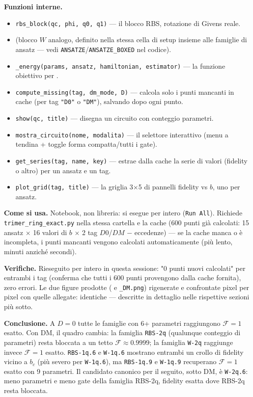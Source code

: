 \documentclass[11pt,a4paper]{article}
\begin{document}
\textbf{Funzioni interne.}
\begin{itemize}
\item \texttt{rbs\_block(qc,\ phi,\ q0,\ q1)} — il blocco RBS, rotazione di Givens
reale.
\item (blocco $W$ analogo, definito nella stessa cella di setup insieme alle
famiglie di ansatz — vedi \texttt{ANSATZE}/\texttt{ANSATZE\_BOXED} nel codice).
\item \texttt{\_energy(params,\ ansatz,\ hamiltonian,\ estimator)} — la funzione
obiettivo per \texttt{}.
\item \texttt{compute\_missing(tag,\ dm\_mode,\ D)} — calcola solo i punti mancanti
in cache (per tag \texttt{"D0"} o \texttt{"DM"}), salvando dopo ogni punto.
\item \texttt{show(qc,\ title)} — disegna un circuito con conteggio parametri.
\item \texttt{mostra\_circuito(nome,\ modalita)} — il selettore interattivo (menu a
tendina + toggle forma compatta/tutti i gate).
\item \texttt{get\_series(tag,\ name,\ key)} — estrae dalla cache la serie di
valori (fidelity o altro) per un ansatz e un tag.
\item \texttt{plot\_grid(tag,\ title)} — la griglia 3$\times$5 di pannelli fidelity
vs $b$, uno per ansatz.
\end{itemize}

\textbf{Come si usa.} Notebook, non libreria: si esegue per intero
(\texttt{Run All}). Richiede \texttt{trimer\_ring\_exact.py} nella stessa cartella e
la cache \texttt{} (600 punti già
calcolati: 15 ansatz $\times$ 16 valori di $b$ $\times$ 2 tag $D0$/$DM$ $-$
eccedenze) — se la cache manca o è incompleta, i punti mancanti vengono calcolati
automaticamente (più lento, minuti anziché secondi).

\textbf{Verifiche.} Rieseguito per intero in questa sessione: "0 punti nuovi
calcolati" per entrambi i tag (conferma che tutti i 600 punti provengono dalla
cache fornita), zero errori. Le due figure prodotte
(\texttt{} e
\texttt{\_DM.png}) rigenerate e confrontate pixel per pixel con quelle allegate:
identiche — descritte in dettaglio nelle rispettive sezioni più sotto.

\textbf{Conclusione.} A $D=0$ tutte le famiglie con 6+ parametri raggiungono
$\mathcal F=1$ esatto. Con DM, il quadro cambia: la famiglia \texttt{RBS-2q}
(qualunque conteggio di parametri) resta bloccata a un tetto $\mathcal
F\approx0.9999$; la famiglia \texttt{W-2q} raggiunge invece $\mathcal F=1$ esatto.
\texttt{RBS-1q.6} e \texttt{W-1q.6} mostrano entrambi un crollo di fidelity vicino a
$b_c$ (più severo per \texttt{W-1q.6}), ma \texttt{RBS-1q.9} e \texttt{W-1q.9}
recuperano $\mathcal F=1$ esatto con 9 parametri. Il candidato canonico per il
seguito, sotto DM, è \texttt{W-2q.6}: meno parametri e meno gate della famiglia
RBS-2q, fidelity esatta dove RBS-2q resta bloccata.
\end{document}
